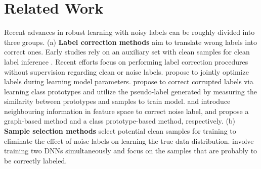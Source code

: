 \documentclass{article} \usepackage{iclr2023_conference,times}
\begin{document}
\section{Related Work}
\label{sec:related_work}
Recent advances in robust learning with noisy labels can be roughly divided into three groups.
(a) \textbf{Label correction methods} aim to translate wrong labels into correct ones.
Early studies rely on an auxiliary set with clean samples
for clean label inference \citep{Xiao2015LearningFM,Vahdat2017TowardRA,Li2017LearningFN,Lee2018CleanNetTL}.
Recent efforts focus on performing label correction procedures without supervision regarding clean or noise labels.
\citep{Yi2019ProbabilisticEN,Tanaka2018JointOF} propose to jointly optimize labels during learning model parameters.
\citet{li2020mopro} propose to correct corrupted labels via learning class prototypes and utilize the pseudo-label generated by measuring the similarity between prototypes and samples to train model. \citet{wu2021ngc} and \citet{li2021learning} introduce neighbouring information in feature space  to correct noise label, and propose a graph-based method and a class prototype-based method, respectively. 
(b) \textbf{Sample selection methods}
select potential clean samples for training to eliminate the effect of noise labels on learning the true data distribution.
\citep{Han2018CoteachingRT,Jiang2018MentorNetLD,Jiang2020BeyondSN,Yu2019HowDD} involve training two DNNs simultaneously and focus on the samples that are probably to be correctly labeled.
\end{document}
